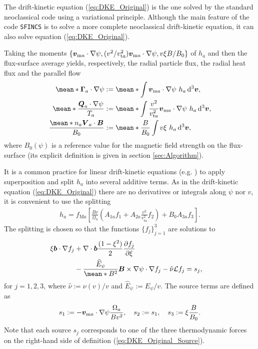 The drift-kinetic equation (\ref{eq:DKE_Original}) is the one solved by the standard neoclassical code {\DKES} \cite{DKES1986, VanRij_1989} using a variational principle. 
Although the main feature of the code \texttt{SFINCS} \cite{Landreman_2014} is to solve a more complete neoclassical drift-kinetic equation, it can also solve equation (\ref{eq:DKE_Original}).

Taking the moments $\{\vb*{v}_{\text{m} a} \cdot \nabla\psi,  (v^2/v_{\text{t}a}^2)\vb*{v}_{\text{m} a} \cdot \nabla\psi, v\xi B/B_0\}$ of $h_a$ and then the flux-surface average yields, respectively, the radial particle flux, the radial heat flux and the parallel flow
%
\begin{align}
	\mean*{\vb*{\Gamma}_a \cdot \nabla \psi} & := 
	\mean*{
		\int
		\vb*{v}_{\text{m} a} \cdot \nabla\psi	
		\ h_a
		\dd[3]{\vb*{v}}
	},
   \label{eq:Particle_flux_Original}
	\\
	\mean*{\frac{\vb*{Q}_a \cdot \nabla \psi}{T_a}} & := 
	\mean*{
		\int
		\frac{v^2}{v_{\text{t}a}^2}\vb*{v}_{\text{m} a} \cdot \nabla\psi	
		\ h_a
		\dd[3]{\vb*{v}}
	},
    \label{eq:Heat_flux_Original}
	\\
	\frac{\mean*{n_a \vb*{V}_{a} \cdot\vb*{B}}}{B_{0}} & :=
	\mean*{
		\frac{B}{B_0}
		\int
		v \xi 
		\ h_a
		\dd[3]{\vb*{v}}
	},
    \label{eq:Parallel_flow_Original}
\end{align}
where $B_0(\psi)$ is a reference value for the magnetic field strength on the flux-surface (its explicit definition is given in section \ref{sec:Algorithm}).

It is a common practice for linear drift-kinetic equations (e.g. \cite{DKES1986, Beidler_2011,Landreman_2014}) to apply superposition and split $h_a$ into several additive terms. As in the drift-kinetic equation (\ref{eq:DKE_Original}) there are no derivatives or integrals along $\psi$ nor $v$, it is convenient to use the splitting
%
\begin{align}
	h_a 
	= 
	f_{\text{M}a}
	\left[
	\frac{B v}{\Omega_a} 
	\left(
	A_{1a} f_1 
	+ 
	A_{2a}  
	\frac{v^2}{v_{\text{t}a}^2}f_2
	\right)
	+
	B_0 A_{3a} f_3
	\right].
	\label{eq:Distribution_function_superposition}
\end{align}
The splitting is chosen so that the functions $\{f_j\}_{j=1}^{3}$ are solutions to
%
\begin{align}
	\xi \vb*{b}  \cdot 
	\nabla f_j
	& +
	\nabla \cdot \vb*{b} \frac{(1-\xi^2)}{2}  \pdv{f_j}{\xi}  
	\nonumber\\
	&
	- 
	\frac{\widehat{E}_\psi}{\mean*{B^2}}
	\vb*{B}\times \nabla\psi\cdot \nabla f_j
%	 
	\label{eq:DKE}
	- \hat{\nu}\Lorentz f_j
	=  s_j, \quad 
\end{align}
for $j=1,2,3$, where $\hat{\nu} := \nu(v) / v$ and $\widehat{E}_\psi := {E}_\psi/v$. The source terms are defined as
%
\begin{align}
	s_1 := - \vb*{v}_{\text{m} a} \cdot \nabla\psi \frac{\Omega_a}{B v^2},
	\quad
	s_2 :=  s_1, 
	\quad
	s_3 := \xi \frac{B}{B_0}.
	\label{eq:DKE_Sources}
\end{align} 
Note that each source $s_j$ corresponds to one of the three thermodynamic forces on the right-hand side of definition (\ref{eq:DKE_Original_Source}).

